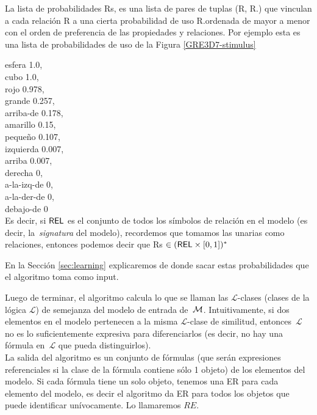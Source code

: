 La lista de probabilidades Rs, es una lista de pares de tuplas (R, R.\puse) que vinculan a cada
relaci\'on R a una cierta probabilidad de uso R.\puse ordenada de mayor a menor con el orden de preferencia de las propiedades y relaciones. Por ejemplo esta es una lista de probabilidades de uso de la Figura \ref{GRE3D7-stimulus}

esfera 1.0, \\
cubo 1.0,\\
rojo 0.978,\\ 
grande 0.257,\\ 
arriba-de 0.178,\\ 
amarillo 0.15,\\
peque\~no 0.107,\\ 
izquierda 0.007,\\
arriba 0.007, \\
derecha 0, \\
a-la-izq-de 0, \\
a-la-der-de 0, \\
debajo-de 0\\

Es decir, si $\textsf{REL}$ es el
conjunto de todos los s\'imbolos de relaci\'on en el modelo (es decir, la~\emph{signatura} del modelo), recordemos que tomamos las unarias como relaciones, entonces podemos decir que Rs $\in (\textsf{REL} \times [0,1])^*$

En la Secci\'on \ref{sec:learning} explicaremos de donde sacar estas probabilidades que el algoritmo toma como input.

Luego de terminar, el algoritmo calcula lo que se llaman las $\mathcal {L}$-clases (clases de la l\'ogica $\mathcal {L}$) de semejanza del modelo de entrada de~$\mathcal{M} $. Intuitivamente, si dos elementos en el modelo pertenecen a la misma $\mathcal {L}$-clase de similitud, entonces~$\mathcal {L}$ no es lo suficientemente expresiva para diferenciarlos (es decir, no hay una f\'ormula en~$\mathcal {L }$ que pueda distinguirlos).\\

La salida del algoritmo es un conjunto de f\'ormulas (que ser\'an expresiones referenciales si la clase de la f\'ormula contiene s\'olo 1 objeto) de los elementos del modelo. Si cada f\'ormula tiene un solo objeto, tenemos una ER para cada elemento del modelo, es decir el algoritmo da ER para todos los objetos que puede identificar un\'ivocamente. Lo llamaremos $RE$.\\

